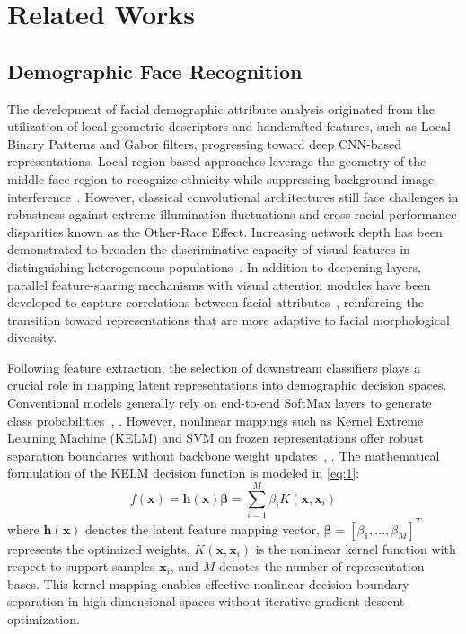 \section{Related Works}
\label{sec:related_works}

\subsection{Demographic Face Recognition}
\label{sec:demographic_face_recognition}

The development of facial demographic attribute analysis originated from the utilization of local geometric descriptors and handcrafted features, such as Local Binary Patterns and Gabor filters, progressing toward deep CNN-based representations. Local region-based approaches leverage the geometry of the middle-face region to recognize ethnicity while suppressing background image interference~\cite{ref11}. However, classical convolutional architectures still face challenges in robustness against extreme illumination fluctuations and cross-racial performance disparities known as the Other-Race Effect. Increasing network depth has been demonstrated to broaden the discriminative capacity of visual features in distinguishing heterogeneous populations~\cite{ref13}. In addition to deepening layers, parallel feature-sharing mechanisms with visual attention modules have been developed to capture correlations between facial attributes~\cite{ref16}, reinforcing the transition toward representations that are more adaptive to facial morphological diversity.

Following feature extraction, the selection of downstream classifiers plays a crucial role in mapping latent representations into demographic decision spaces. Conventional models generally rely on end-to-end SoftMax layers to generate class probabilities~\cite{ref11}, \cite{ref18}. However, nonlinear mappings such as Kernel Extreme Learning Machine (KELM) and SVM on frozen representations offer robust separation boundaries without backbone weight updates~\cite{ref13}, \cite{ref12}. The mathematical formulation of the KELM decision function is modeled in \eqref{eq:1}:
\begin{equation}
f(\mathbf{x}) = \mathbf{h}(\mathbf{x})\boldsymbol{\beta} = \sum_{i=1}^M \beta_i K(\mathbf{x}, \mathbf{x}_i)
\label{eq:1}
\end{equation}
where $\mathbf{h}(\mathbf{x})$ denotes the latent feature mapping vector, $\boldsymbol{\beta} = [\beta_1, \dots, \beta_M]^T$ represents the optimized weights, $K(\mathbf{x}, \mathbf{x}_i)$ is the nonlinear kernel function with respect to support samples $\mathbf{x}_i$, and $M$ denotes the number of representation bases. This kernel mapping enables effective nonlinear decision boundary separation in high-dimensional spaces without iterative gradient descent optimization.

